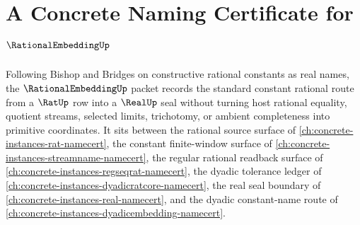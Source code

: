 \chapter{A Concrete Naming Certificate for $\RationalEmbeddingUp$}
\label{ch:concrete-instances-rationalembedding-namecert}

Following Bishop and Bridges on constructive rational constants as real names, the $\RationalEmbeddingUp$ packet records the standard constant rational route from a $\RatUp$ row into a $\RealUp$ seal without turning host rational equality, quotient streams, selected limits, trichotomy, or ambient completeness into primitive coordinates. It sits between the rational source surface of \autoref{ch:concrete-instances-rat-namecert}, the constant finite-window surface of \autoref{ch:concrete-instances-streamname-namecert}, the regular rational readback surface of \autoref{ch:concrete-instances-regseqrat-namecert}, the dyadic tolerance ledger of \autoref{ch:concrete-instances-dyadicratcore-namecert}, the real seal boundary of \autoref{ch:concrete-instances-real-namecert}, and the dyadic constant-name route of \autoref{ch:concrete-instances-dyadicembedding-namecert}.

